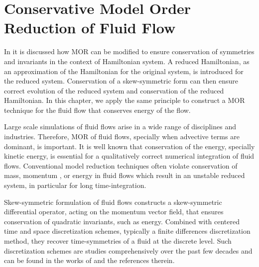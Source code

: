 \chapter{Conservative Model Order Reduction of Fluid Flow} \label{chapter:7}

In  it is discussed how MOR can be modified to ensure conservation of symmetries and invariants in the context of Hamiltonian system. A reduced Hamiltonian, as an approximation of the Hamiltonian for the original system, is introduced for the reduced system. Conservation of a skew-symmetric form can then ensure correct evolution of the reduced system and conservation of the reduced Hamiltonian. In this chapter, we apply the same principle to construct a MOR technique for the fluid flow that conserves energy of the flow.

Large scale simulations of fluid flows arise in a wide range of disciplines and industries. Therefore, MOR of fluid flows, specially when advective terms are dominant, is important. It is well known that conservation of the energy, specially kinetic energy, is essential for a qualitatively correct numerical integration of fluid flows. Conventional model reduction techniques often violate conservation of mass, momentum \cite{carlberg2018conservative}, or energy in fluid flows which result in an unstable reduced system, in particular for long time-integration. 

Skew-symmetric formulation of fluid flows constructs a skew-symmetric differential operator, acting on the momentum vector field, that ensures conservation of quadratic invariants, such as energy. Combined with centered time and space discretization schemes, typically a finite differences discretization method, they recover time-symmetries of a fluid at the discrete level. Such discretization schemes are studies comprehensively over the past few decades and can be found in the works of \cite{morinishi2010skew,morinishi1998fully,desjardins2008high,tadmor1984skew,reiss2014conservative} and the references therein.

